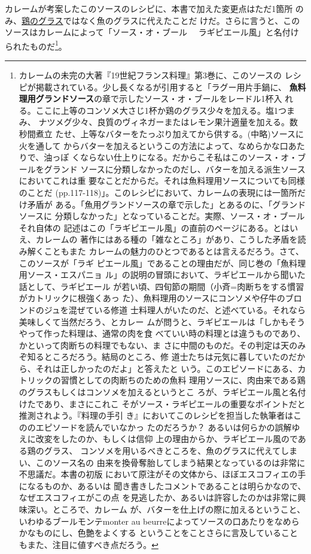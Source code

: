 \begin{recette}
カレームが考案したこのソースのレシピに、本書で加えた変更点はただ1箇所
のみ、\protect\hyperlink{glace-de-volaille}{鶏のグラス}ではなく魚のグラスに代えたことだ
けだ。さらに言うと、このソースはカレームによって「ソース・オ・ブール　
ラギピエール風」と名付けられたものだ\footnote{カレームの未完の大著『19世紀フランス料理』第3巻に、このソースの
  レシピが掲載されている。少し長くなるが引用すると「ラグー用片手鍋に、\textbf{
  魚料理用グランドソース}の章で示したソース・オ・ブールをレードル1杯入
  れる。ここに上等のコンソメ大さじ1杯か鶏のグラス少々を加える。塩1つまみ、
  ナツメグ少々、良質のヴィネガーまたはレモン果汁適量を加える。数秒間煮立
  たせ、上等なバターをたっぷり加えてから供する。(中略)ソースに火を通して
  からバターを加えるというこの方法によって、なめらかな口あたりで、油っぽ
  くならない仕上りになる。だからこそ私はこのソース・オ・ブールをグランド
  ソースに分類しなかったのだし、バターを加える派生ソースにおいてこれは重
  要なことだからだ。それは魚料理用ソースについても同様のことだ
  (pp.117-118)」。このレシピにおいて、カレームの表現には一箇所だけ矛盾が
  ある。「魚用グランドソースの章で示した」とあるのに、「グランドソースに
  分類しなかった」となっていることだ。実際、ソース・オ・ブールそれ自体の
  記述はこの「ラギピエール風」の直前のページにある。とはいえ、カレームの
  著作にはある種の「雑なところ」があり、こうした矛盾を読み解くこともまた
  カレームの魅力のひとつであるとは言えるだろう。さて、このソースが「ラギ
  ピエール風」であることの理由だが、同じ巻の「魚料理用ソース・エスパニョ
  ル」の説明の冒頭において、ラギピエールから聞いた話として、ラギピエール
  が若い頃、四旬節の期間（小斉=肉断ちをする慣習がカトリックに根強くあっ
  た）、魚料理用のソースにコンソメや仔牛のブロンドのジュを混ぜている修道
  士料理人がいたのだ、と述べている。それなら美味しくて当然だろう、とカレー
  ムが問うと、ラギピエールは「しかもそうやって作った料理は、通常の肉を食
  べていい時の料理とは違うものであり、かといって肉断ちの料理でもない、ま
  さに中間のものだ。その判定は天のみぞ知るところだろう。結局のところ、修
  道士たちは元気に暮していたのだから、それは正しかったのだよ」と答えたと
  いう。このエピソードにある、カトリックの習慣としての肉断ちのための魚料
  理用ソースに、肉由来である鶏のグラスもしくはコンソメを加えるというとこ
  ろが、ラギピエール風と名付けたであり、まさにこれこ
  そがソース・ラギピエールの重要なポイントだと推測されよう。『料理の手引
  き』においてこのレシピを担当した執筆者はこののエピソードを読んでいなかっ
  たのだろうか？ あるいは何らかの誤解ゆえに改変をしたのか、もしくは信仰
  上の理由からか、ラギピエール風のである鶏のグラス、
  コンソメを用いるべきところを、魚のグラスに代えてしまい、このソース名の
  由来を換骨奪胎してしまう結果となっているのは非常に不思議だ。本書の初版
  において原注がその文体から、ほぼエスコフィエの手になるものか、あるいは
  聞き書きしたコメントであることは明らかなので、なぜエスコフィエがこの点
  を見逃したか、あるいは許容したのかは非常に興味深い。ところで、カレーム
  が、バターを仕上げの際に加えるということ、いわゆるブールモンテmonter
  au beurreによってソースの口あたりをなめらかなものにし、色艶をよくする
  ということをことさらに言及していることもまた、注目に値すべき点だろう。}。


\end{recette}
